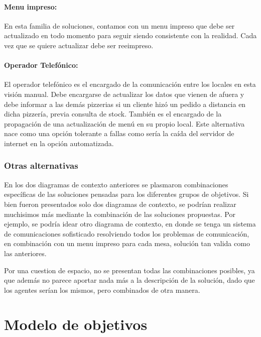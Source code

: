 \documentclass[a4paper,10pt]{article}
\begin{document}
\paragraph{Menu impreso:}
En esta familia de soluciones, contamos con un menu impreso que debe ser actualizado en todo momento para seguir siendo consistente con la realidad. Cada vez que se quiere actualizar debe ser reeimpreso.
\\
\paragraph{Operador Telef\'onico:}
El operador telef\'onico es el encargado de la comunicaci\'on entre los locales en esta visi\'on manual.
Debe encargarse de actualizar los datos que vienen de afuera y debe informar a las dem\'as pizzerias si un cliente hiz\'o un pedido a distancia en dicha pizzer\'ia, previa consulta de stock. Tambi\'en es el encargado de la propagaci\'on de una actualizaci\'on de men\'u en su propio local. Este alternativa nace como una opci\'on tolerante a fallas como ser\'ia la ca\'ida del servidor de internet en la opci\'on automatizada. 



\subsubsection*{Otras alternativas} 

En los dos diagramas de contexto anteriores se plasmaron combinaciones espec\'ificas de las soluciones pensadas para los diferentes grupos de
objetivos. Si bien fueron presentados solo dos diagramas de contexto, se podr\'ian realizar muchisimos m\'as mediante la combinaci\'on de las 
soluciones propuestas. Por ejemplo, se podr\'ia idear otro diagrama de contexto, en donde se tenga un sistema de comunicaciones sofisticado resolviendo
todos los problemas de comunicaci\'on, en combinaci\'on con un menu impreso para cada mesa, soluci\'on tan valida como las anteriores.

Por una cuestion de espacio, no se presentan todas las combinaciones posibles, ya que adem\'as no parece aportar nada m\'as a la descripci\'on
de la soluci\'on, dado que los agentes ser\'ian los mismos, pero combinados de otra manera.

\bigskip

\section*{Modelo de objetivos}
\end{document}
